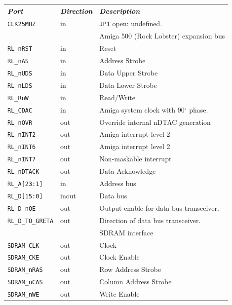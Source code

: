 \documentclass[a4paper]{report}
\begin{document}
\begin{table}
\begin{tabular}{*3l}    \toprule
\emph{Port}             & \emph{Direction}  & \emph{Description} \\ \midrule
\texttt{CLK25MHZ}       & in  & \texttt{JP1} open: undefined. \\
\midrule
\midrule
                            &     & Amiga 500 (Rock Lobster) expansion bus\\
\midrule
\texttt{RL\_nRST}           & in  & Reset\\
\texttt{RL\_nAS}            & in  & Address Strobe\\
\texttt{RL\_nUDS}           & in  & Data Upper Strobe\\
\texttt{RL\_nLDS}           & in  & Data Lower Strobe\\
\texttt{RL\_RnW}            & in  & Read/Write\\
\texttt{RL\_CDAC}           & in  & Amiga system clock with 90$^{\circ}$ phase.\\
\texttt{RL\_nOVR}           & out & Override internal nDTAC generation\\
\texttt{RL\_nINT2}          & out & Amiga interrupt level 2\\
\texttt{RL\_nINT6}          & out & Amiga interrupt level 2\\
\texttt{RL\_nINT7}          & out & Non-maskable interrupt\\
\texttt{RL\_nDTACK}         & out & Data Acknowledge\\
\texttt{RL\_A[23:1]}        & in  & Address bus \\
\texttt{RL\_D[15:0]}        & inout & Data bus \\
\texttt{RL\_D\_nOE}         & out & Output enable for data bus transceiver. \\
\texttt{RL\_D\_TO\_GRETA}   & out & Direction of data bus transceiver.\\
\midrule
\midrule
                            &       & SDRAM interface \\
\midrule
\texttt{SDRAM\_CLK}         & out   & Clock \\
\texttt{SDRAM\_CKE}         & out   & Clock Enable \\
\texttt{SDRAM\_nRAS}        & out   & Row Address Strobe \\
\texttt{SDRAM\_nCAS}        & out   & Column Address Strobe \\
\texttt{SDRAM\_nWE}         & out   & Write Enable \\

\end{tabular}
\end{table}
\end{document}

